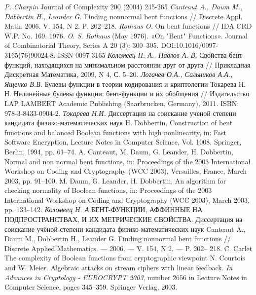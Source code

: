 \begin{thebibliography}{99}
 {\it P. Charpin} Journal of Complexity 200 (2004) 245-265
 {\it Canteaut A., Daum M., Dobbertin H., Leander G.} Finding nonnormal bent
functions // Discrete Appl. Math. 2006. V. 154, N 2. P. 202–218.
 {\it Rothaus O.} On bent functions // IDA CRD W.P. No. 169. 1976.
  {\it O. S. Rothaus} (May 1976). «On "Bent" Functions». Journal of Combinatorial Theory, Series A 20 (3): 300–305. DOI:10.1016/0097-3165(76)90024-8. ISSN 0097-3165
 {\it Коломеец Н. А., Павлов А. В.} Свойства бент-функций, находящихся
на минимальном расстоянии друг от друга // Прикладная Дискретная
Математика, 2009, N 4, С. 5–20.
 {\it Логачев О.А., Сальников А.А., Ященко В.В.} Булевы функции в теории кодирования и криптологии
Токарева Н. Н. Нелинейные булевы функции: бент-функции и их обобщения // Издательство LAP
LAMBERT Academic Publishing (Saarbrucken, Germany), 2011. ISBN: 978-3-8433-0904-2.
 {\it Токарева Н.И.} Диссертация на соискание ученой степени
кандидата физико-математических наук
 H. Dobbertin, Construction of bent functions and balanced Boolean functions with high
nonlinearity, in: Fast Software Encryption, Lecture Notes in Computer Science, Vol. 1008, Springer,
Berlin, 1994, pp. 61–74.
A. Canteaut, M. Daum, G. Leander, H. Dobbertin, Normal and non normal bent functions, in:
Proceedings of the 2003 International Workshop on Coding and Cryptography (WCC 2003),
Versailles, France, March 2003, pp. 91–100.
 M. Daum, G. Leander, H. Dobbertin, An algorithm for checking normality of Boolean functions, in:
Proceedings of the 2003 International Workshop on Coding and Cryptography (WCC 2003), March
2003, pp. 133–142.
 {\it Коломеец Н. А} БЕНТ-ФУНКЦИИ, АФФИННЫЕ НА ПОДПРОСТРАНСТВАХ, И ИХ
МЕТРИЧЕСКИЕ СВОЙСТВА. Диссертация на соискание учёной степени
кандидата физико-математических наук
 Canteaut A., Daum M., Dobbertin H., Leander G. Finding nonnormal bent
functions // Discrete Applied Mathematics. — 2006. — V. 154, N 2. — P. 202–
218.
 C. Carlet The complexity of Boolean functions from cryptographic viewpoint
N. Courtois and W. Meier. Algebraic attacks on stream ciphers with linear feedback. {\it In Advances in Cryptology - EUROCRYPT 2003}, number 2656 in Lecture Notes in Computer Science, pages 345–359. Springer Verlag,  2003.

\end{thebibliography}
